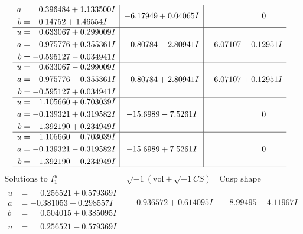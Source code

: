\documentclass[1p]{elsarticle_modified}
\theoremstyle{definition}
\newcommand{\I}{\sqrt{-1}}
\begin{document}
$$\begin{array}{c|c|c}
\begin{aligned}
a &= \phantom{-}0.396484 + 1.133500 I \\
b &= -0.14752 + 1.46554 I\end{aligned}
 & -6.17949 + 0.04065 I & \phantom{-0.000000 } 0 \\ \hline\begin{aligned}
u &= \phantom{-}0.633067 + 0.299009 I \\
a &= \phantom{-}0.975776 + 0.355361 I \\
b &= -0.595127 - 0.034941 I\end{aligned}
 & -0.80784 - 2.80941 I & \phantom{-}6.07107 - 0.12951 I \\ \hline\begin{aligned}
u &= \phantom{-}0.633067 - 0.299009 I \\
a &= \phantom{-}0.975776 - 0.355361 I \\
b &= -0.595127 + 0.034941 I\end{aligned}
 & -0.80784 + 2.80941 I & \phantom{-}6.07107 + 0.12951 I \\ \hline\begin{aligned}
u &= \phantom{-}1.105660 + 0.703039 I \\
a &= -0.139321 + 0.319582 I \\
b &= -1.392190 + 0.234949 I\end{aligned}
 & -15.6989 - 7.5261 I & \phantom{-0.000000 } 0 \\ \hline\begin{aligned}
u &= \phantom{-}1.105660 - 0.703039 I \\
a &= -0.139321 - 0.319582 I \\
b &= -1.392190 - 0.234949 I\end{aligned}
 & -15.6989 + 7.5261 I & \phantom{-0.000000 } 0\\
 \hline 
 \end{array}$$\newpage$$\begin{array}{c|c|c}  
\text{Solutions to }I^u_{1}& \I (\text{vol} + \sqrt{-1}CS) & \text{Cusp shape}\\
 \hline 
\begin{aligned}
u &= \phantom{-}0.256521 + 0.579369 I \\
a &= -0.381053 + 0.298557 I \\
b &= \phantom{-}0.504015 + 0.385095 I\end{aligned}
 & \phantom{-}0.936572 + 0.614095 I & \phantom{-}8.99495 - 4.11967 I \\ \hline\begin{aligned}
u &= \phantom{-}0.256521 - 0.579369 I \\

\end{aligned}
\end{array}$$
\end{document}
